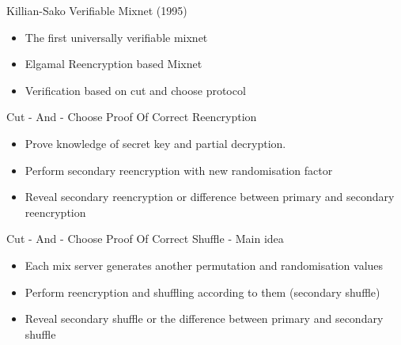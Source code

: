 \documentclass{beamer}
\begin{document}
\begin{frame}[allowframebreaks]{Killian-Sako Verifiable Mixnet (1995)}
\begin{itemize}
\item The first universally verifiable mixnet
\item Elgamal Reencryption based Mixnet 
\item Verification based on cut and choose protocol
\end{itemize}
\begin{block}{Cut - And - Choose Proof Of Correct Reencryption}
\begin{itemize}
\item Prove knowledge of secret key and partial decryption.
\item Perform secondary reencryption with new randomisation factor
\item Reveal secondary reencryption or difference between primary and secondary reencryption
\end{itemize}
\end{block}

\begin{block}{Cut - And - Choose Proof Of Correct Shuffle - Main idea}
\begin{itemize}
\item Each mix server generates another permutation and randomisation values
\item Perform reencryption and shuffling according to them (secondary shuffle)
\item Reveal secondary shuffle or the difference between primary and secondary shuffle
\end{itemize}
\end{block}
\end{frame}
\end{document}
